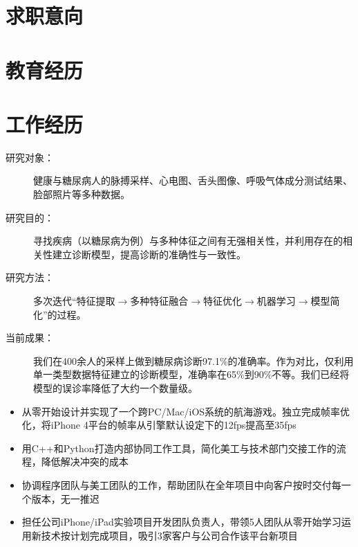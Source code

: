 \documentclass[10pt,a4paper]{moderncv/moderncv}
\begin{document}
\maketitle

\section{求职意向}

\section{教育经历}


\section{工作经历}
{
\begin{description}
	\item[研究对象：] 健康与糖尿病人的脉搏采样、心电图、舌头图像、呼吸气体成分测试结果、脸部照片等多种数据。
	\item[研究目的：] 寻找疾病（以糖尿病为例）与多种体征之间有无强相关性，并利用存在的相关性建立诊断模型，提高诊断的准确性与一致性。
	\item[研究方法：] 多次迭代``特征提取$\rightarrow$多种特征融合$\rightarrow$特征优化$\rightarrow$机器学习$\rightarrow$模型简化''的过程。
	\item[当前成果：] 我们在400余人的采样上做到糖尿病诊断97.1\%的准确率。作为对比，仅利用单一类型数据特征建立的诊断模型，准确率在65\%到90\%不等。我们已经将模型的误诊率降低了大约一个数量级。
\end{description}
}

{
\begin{itemize}
	\item 从零开始设计并实现了一个跨PC/Mac/iOS系统的航海游戏。独立完成帧率优化，将iPhone 4平台的帧率从引擎默认设定下的12fps提高至35fps
	\item 用C++和Python打造内部协同工作工具，简化美工与技术部门交接工作的流程，降低解决冲突的成本
	\item 协调程序团队与美工团队的工作，帮助团队在全年项目中向客户按时交付每一个版本，无一推迟
	\item 担任公司iPhone/iPad实验项目开发团队负责人，带领5人团队从零开始学习运用新技术按计划完成项目，吸引3家客户与公司合作该平台新项目
\end{itemize}
}
\end{document}
